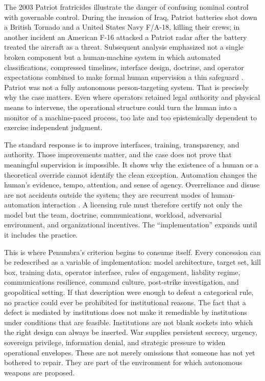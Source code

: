 \documentclass[11pt]{article}
\begin{document}
The 2003 Patriot fratricides illustrate the danger of confusing nominal control with governable control. During the invasion of Iraq, Patriot batteries shot down a British Tornado and a United States Navy F/A-18, killing their crews; in another incident an American F-16 attacked a Patriot radar after the battery treated the aircraft as a threat. Subsequent analysis emphasized not a single broken component but a human-machine system in which automated classifications, compressed timelines, interface design, doctrine, and operator expectations combined to make formal human supervision a thin safeguard \citep{dsb2005, scharre2018}. Patriot was not a fully autonomous person-targeting system. That is precisely why the case matters. Even where operators retained legal authority and physical means to intervene, the operational structure could turn the human into a monitor of a machine-paced process, too late and too epistemically dependent to exercise independent judgment.

The standard response is to improve interfaces, training, transparency, and authority. Those improvements matter, and the case does not prove that meaningful supervision is impossible. It shows why the existence of a human or a theoretical override cannot identify the clean exception. Automation changes the human's evidence, tempo, attention, and sense of agency. Overreliance and disuse are not accidents outside the system; they are recurrent modes of human-automation interaction \citep{parasuraman1997}. A licensing rule must therefore certify not only the model but the team, doctrine, communications, workload, adversarial environment, and organizational incentives. The ``implementation'' expands until it includes the practice.

This is where Penumbra's criterion begins to consume itself. Every concession can be redescribed as a variable of implementation: model architecture, target set, kill box, training data, operator interface, rules of engagement, liability regime, communications resilience, command culture, post-strike investigation, and geopolitical setting. If that description were enough to defeat a categorical rule, no practice could ever be prohibited for institutional reasons. The fact that a defect is mediated by institutions does not make it remediable by institutions under conditions that are feasible. Institutions are not blank sockets into which the right design can always be inserted. War supplies persistent secrecy, urgency, sovereign privilege, information denial, and strategic pressure to widen operational envelopes. These are not merely omissions that someone has not yet bothered to repair. They are part of the environment for which autonomous weapons are proposed.
\end{document}
